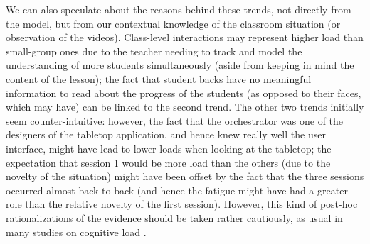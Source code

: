 \documentclass[10pt,journal,compsoc]{IEEEtran}
\begin{document}
We can also speculate about the reasons behind these trends, not directly from the model, but from our contextual knowledge of the classroom situation (or observation of the videos). Class-level interactions may represent higher load than small-group ones due to the teacher needing to track and model the understanding of more students simultaneously (aside from keeping in mind the content of the lesson); the fact that student backs have no meaningful information to read about the progress of the students (as opposed to their faces, which may have) can be linked to the second trend. The other two trends initially seem counter-intuitive: however, the fact that the orchestrator was one of the designers of the tabletop application, and hence knew really well the user interface, might have lead to lower loads when looking at the tabletop; the expectation that session 1 would be more load than the others (due to the novelty of the situation) might have been offset by the fact that the three sessions occurred almost back-to-back (and hence the fatigue might have had a greater role than the relative novelty of the first session). However, this kind of post-hoc rationalizations of the evidence should be taken rather cautiously, as usual in many studies on cognitive load \cite{de2010cognitive}.

\end{document}
